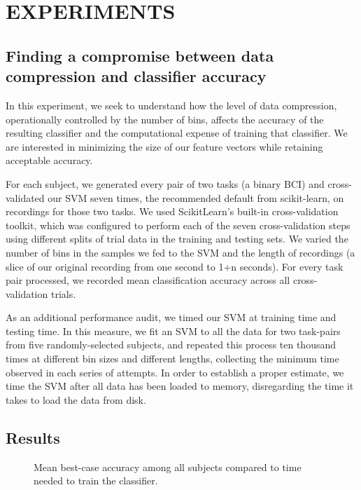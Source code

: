 \section{\uppercase{Experiments}}

\subsection{Finding a compromise between data compression and classifier accuracy}

In this experiment, we seek to understand how the level of data compression, operationally controlled by the number of bins, affects the accuracy of the resulting classifier and the computational expense of training that classifier. We are interested in minimizing the size of our feature vectors while retaining acceptable accuracy.

For each subject, we generated every pair of two tasks (a binary BCI) and cross-validated our SVM seven times, the recommended default from scikit-learn, on recordings for those two tasks. We used ScikitLearn's built-in cross-validation toolkit, which was configured to perform each of the seven cross-validation steps using different splits of trial data in the training and testing sets. We varied the number of bins in the samples we fed to the SVM and the length of recordings (a slice of our original recording from one second to 1+n seconds). For every task pair processed, we recorded mean classification accuracy across all cross-validation trials.

As an additional performance audit, we timed our SVM at training time and testing time. In this measure, we fit an SVM to all the data for two task-pairs from five randomly-selected subjects, and repeated this process ten thousand times at different bin sizes and different lengths, collecting the minimum time observed in each series of attempts. In order to establish a proper estimate, we time the SVM after all data has been loaded to memory, disregarding the time it takes to load the data from disk.

\subsection{Results}

\begin{figure}[!h]
  \vspace{-0.2cm}
  \centering
   {}
  \caption{Mean best-case accuracy among all subjects compared to time needed to train the classifier.}
  \label{fig:fig1a}
  \vspace{-0.1cm}
 \end{figure}

